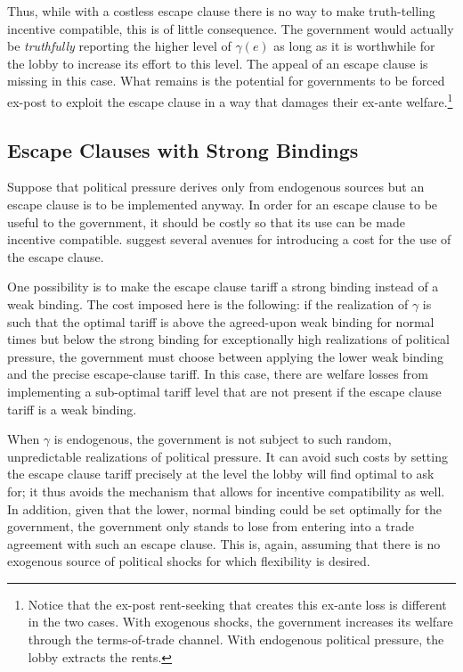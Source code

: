 \documentclass[12pt,titlepage]{article}
\newcommand{\ga}{\gamma}
\begin{document}
Thus, while with a costless escape clause there is no way to make truth-telling incentive compatible, this is of little consequence. The government would actually be \textit{truthfully} reporting the higher level of $\ga(e)$ as long as it is worthwhile for the lobby to increase its effort to this level. The appeal of an escape clause is missing in this case. What remains is the potential for governments to be forced ex-post to exploit the escape clause in a way that damages their ex-ante welfare.\footnote{Notice that the ex-post rent-seeking that creates this ex-ante loss is different in the two cases. With exogenous shocks, the government increases its welfare through the terms-of-trade channel. With endogenous political pressure, the lobby extracts the rents.}

\subsection{Escape Clauses with Strong Bindings}
\label{sec:strong}
Suppose that political pressure derives only from endogenous sources but an escape clause is to be implemented anyway. In order for an escape clause to be useful to the government, it should be costly so that its use can be made incentive compatible. \Textcite{bs2005}  suggest several avenues for introducing a cost for the use of the escape clause.

One possibility is to make the escape clause tariff a strong binding instead of a weak binding. The cost imposed here is the following: if the realization of $\ga$ is such that the optimal tariff is above the agreed-upon weak binding for normal times but below the strong binding for exceptionally high realizations of political pressure, the government must choose between applying the lower weak binding and the precise escape-clause tariff. In this case, there are welfare losses from implementing a sub-optimal tariff level that are not present if the escape clause tariff is a weak binding.

When $\ga$ is endogenous, the government is not subject to such random, unpredictable realizations of political pressure. It can avoid such costs by setting the escape clause tariff precisely at the level the lobby will find optimal to ask for; it thus avoids the mechanism that allows for incentive compatibility as well. In addition, given that the lower, normal binding could be set optimally for the government, the government only stands to lose from entering into a trade agreement with such an escape clause. This is, again, assuming that there is no exogenous source of political shocks for which flexibility is desired.
\end{document}
